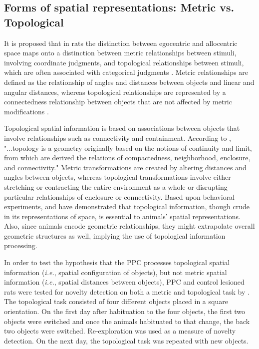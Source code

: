 \documentclass[doc, longtable]{apa6}
\begin{document}
\subsection{Forms of spatial representations: Metric vs. Topological}
It is proposed that in rats the distinction between egocentric and allocentric space maps onto a distinction between metric relationships between stimuli, involving coordinate judgments, and topological relationships between stimuli, which are often associated with categorical judgments \parencite{Baumann2012a}. Metric relationships are defined as the relationship of angles and distances between objects and linear and angular distances, whereas topological relationships are represented by a connectedness relationship between objects that are not affected by metric modifications \parencite{Gallistel1990a, Herrmann2001, Kuipers1988a, Poucet1993a}.

Topological spatial information is based on associations between objects that involve relationships such as connectivity and containment. According to \textcite{Poucet1993a}, "...topology is a geometry originally based on the notions of continuity and limit, from which are derived the relations of compactedness, neighborhood, enclosure, and connectivity." Metric transformations are created by altering distances and angles between objects, whereas topological transformations involve either stretching or contracting the entire environment as a whole or disrupting particular relationships of enclosure or connectivity. Based upon behavioral experiments, \textcite{Poucet1993a} and \textcite{Goodrich-Hunsaker2005a} have demonstrated that topological information, though crude in its representations of space, is essential to animals' spatial representations. Also, since animals encode geometric relationships, they might extrapolate overall geometric structures as well, implying the use of topological information processing. 
	
In order to test the hypothesis that the PPC processes topological spatial information (\textit{i.e.}, spatial configuration of objects), but not metric spatial information (\textit{i.e.}, spatial distances between objects), PPC and control lesioned rats were tested for novelty detection on both a metric and topological task by \textcite{Goodrich-Hunsaker2005a}. The topological task consisted of four different objects placed in a square orientation. On the first day after habituation to the four objects, the first two objects were switched and once the animals habituated to that change, the back two objects were switched. Re-exploration was used as a measure of novelty detection. On the next day, the topological task was repeated with new objects. 
	
\end{document}
